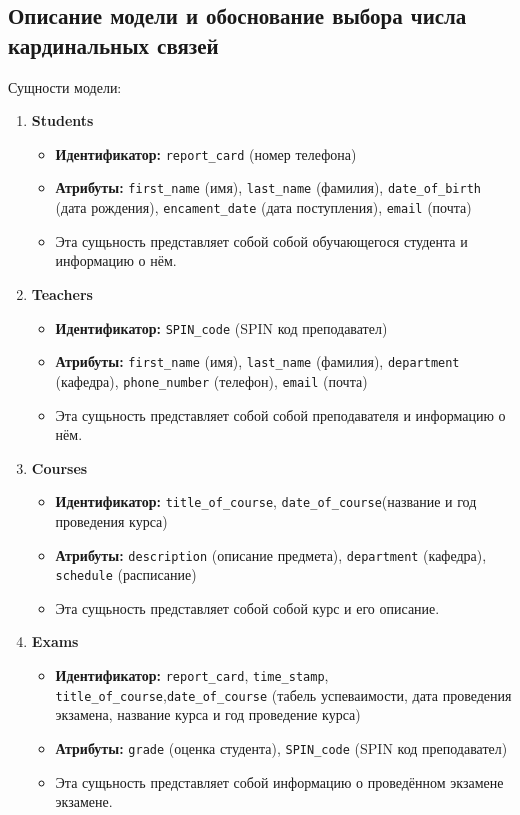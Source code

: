 \documentclass[a4paper, 14pt]{extarticle}
\begin{document}
\subsection{Описание модели и обоснование выбора числа кардинальных связей}\label{Sect::task}
Сущности модели:
\begin{enumerate}
    \item \textbf{Students}
        \begin{itemize}
            \item \textbf{Идентификатор:} \texttt{report\_сard} (номер телефона)
            \item \textbf{Атрибуты:} \texttt{first\_name} (имя), \texttt{last\_name} (фамилия), \texttt{date\_of\_birth} (дата рождения), \texttt{encament\_date} (дата поступления), \texttt{email} (почта)
            \item Эта сущьность представляет собой собой обучающегося студента и информацию о нём.
        \end{itemize}
    
    \item \textbf{Teachers}
        \begin{itemize}
            \item \textbf{Идентификатор:} \texttt{SPIN\_code} (SPIN код преподавател)
            \item \textbf{Атрибуты:} \texttt{first\_name} (имя), \texttt{last\_name} (фамилия), \texttt{department} (кафедра), \texttt{phone\_number} (телефон), \texttt{email} (почта)
            \item Эта сущьность представляет собой собой преподавателя и информацию о нём.
        \end{itemize}

    \item \textbf{Courses}
        \begin{itemize}
            \item \textbf{Идентификатор:} \texttt{title\_of\_course}, \texttt{date\_of\_course}(название и год проведения курса)
            \item \textbf{Атрибуты:} \texttt{description} (описание предмета), \texttt{department} (кафедра), \texttt{schedule} (расписание)
            \item Эта сущьность представляет собой собой курс и его описание.
        \end{itemize}

    \item \textbf{Exams}
        \begin{itemize}
            \item \textbf{Идентификатор:} \texttt{report\_card}, \texttt{time\_stamp}, \texttt{title\_of\_course},\texttt{date\_of\_course} (табель успеваимости, дата проведения экзамена, название курса и год проведение курса)
            \item \textbf{Атрибуты:} \texttt{grade} (оценка студента), \texttt{SPIN\_code} (SPIN код преподавател)
            \item Эта сущьность представляет собой информацию о проведённом экзамене экзамене.
        \end{itemize}
\end{enumerate}
\end{document}
